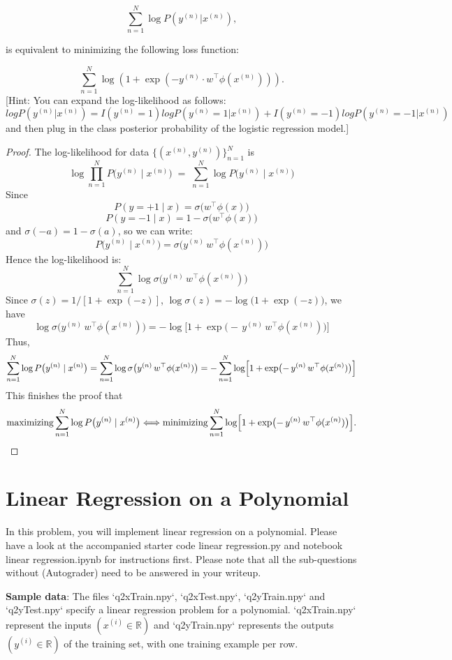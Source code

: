 \documentclass[lang=cn,11pt]{elegantbook}
\begin{document}
\[
\sum_{n=1}^{N} \log P(y^{(n)}|x^{(n)}),
\]

is equivalent to minimizing the following loss function:

\[
\sum_{n=1}^{N} \log \left( 1 + \exp(-y^{(n)} \cdot w^\top \phi(x^{(n)})) \right).
\]
[Hint: You can expand the log-likelihood as follows: 
\[
log P(y^{(n)} | x^{(n)}) = I(y^{(n)} = 1) log P(y^{(n)} = 1 | x^{(n)}) + I(y^{(n)} = -1) log P(y^{(n)} = -1 | x^{(n)})
\]
and then plug in the class posterior probability of the logistic regression model.]
\begin{proof}
The log-likelihood for data \(\{(x^{(n)}, y^{(n)})\}_{n=1}^N\) is
\[
\log \prod_{n=1}^N P\bigl(y^{(n)} \mid x^{(n)}\bigr)
\;=\;
\sum_{n=1}^N \log P\bigl(y^{(n)} \mid x^{(n)}\bigr)
\]
Since 
\[
P(y=+1 \mid x) 
= \sigma\bigl(w^\top \phi(x)\bigr)
\]
\[
P(y=-1 \mid x) 
= 1 - \sigma\bigl(w^\top \phi(x)\bigr)
\]
and $\sigma(-a) = 1 - \sigma(a)$, so we can write:
\[
P\bigl(y^{(n)} \mid x^{(n)}\bigr)
= \sigma\bigl(y^{(n)}\,w^\top \phi(x^{(n)})\bigr)
\]
Hence the log-likelihood is:
\[
\sum_{n=1}^N \log \sigma\bigl(y^{(n)}\,w^\top \phi(x^{(n)})\bigr)
\]
Since \(\sigma(z) = 1 / [1 + \exp(-z)]\), \(
\log \sigma(z)
= -\log\bigl(1 + \exp(-z)\bigr)
\), we have 
\[
\log \sigma\bigl(y^{(n)}\,w^\top \phi(x^{(n)})\bigr)
= -\log\bigl[1 + \exp\bigl(-\,y^{(n)}\,w^\top \phi(x^{(n)})\bigr)\bigr]
\]
Thus,
\[
\sum_{n=1}^N \log P\bigl(y^{(n)}\mid x^{(n)}\bigr)
= \sum_{n=1}^N \log \sigma\bigl(y^{(n)}\,w^\top \phi(x^{(n)})\bigr)
= -\sum_{n=1}^N \log\Bigl[1 + \exp\bigl(-\,y^{(n)}\,w^\top \phi(x^{(n)})\bigr)\Bigr]
\]
This finishes the proof that 
\[\text{maximizing}
\sum_{n=1}^N \log P\bigl(y^{(n)}\mid x^{(n)}\bigr)
\Longleftrightarrow
\text{minimizing}
\sum_{n=1}^N \log\Bigl[1 + \exp\bigl(-\,y^{(n)}\,w^\top \phi(x^{(n)})\bigr)\Bigr].
\]
\end{proof}


\section{Linear Regression on a Polynomial}
In this problem, you will implement linear regression on a polynomial. Please have a look at the accompanied starter code linear regression.py and notebook linear regression.ipynb for instructions first. Please note that all the sub-questions without (Autograder) need to be answered in your writeup.

\textbf{Sample data}: The files `q2xTrain.npy`, `q2xTest.npy`, `q2yTrain.npy` and `q2yTest.npy` specify a linear regression problem for a polynomial. `q2xTrain.npy` represent the inputs $(x^{(i)} ∈ \mathbb{R})$ and `q2yTrain.npy` represents the outputs $(y^{(i)} ∈ \mathbb{R})$ of the training set, with one training example per row.
\end{document}
